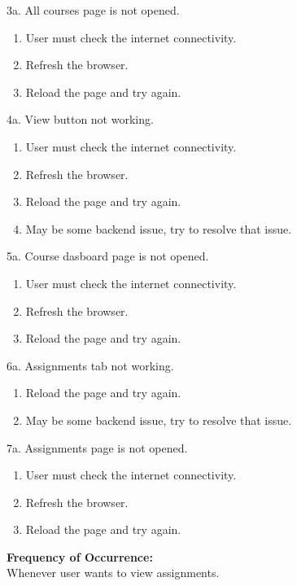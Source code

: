 3a. All courses page is not opened.
\begin{enumerate}
\item User must check the internet connectivity.
\item Refresh the browser.
\item Reload the page and try again.
\end{enumerate}
4a. View button not working.
\begin{enumerate}
\item User must check the internet connectivity.
\item Refresh the browser.
\item Reload the page and try again.
\item May be some backend issue, try to resolve that issue.
\end{enumerate}
5a. Course dasboard page is not opened.
\begin{enumerate}
\item User must check the internet connectivity.
\item Refresh the browser.
\item Reload the page and try again.
\end{enumerate}
6a. Assignments tab not working.
\begin{enumerate}
\item Reload the page and try again.
\item May be some backend issue, try to resolve that issue.
\end{enumerate}
7a. Assignments page is not opened.
\begin{enumerate}
\item User must check the internet connectivity.
\item Refresh the browser.
\item Reload the page and try again.
\end{enumerate}
\textbf{Frequency of Occurrence:}\\
Whenever user wants to view assignments.



